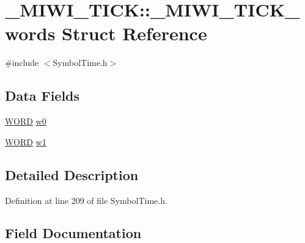 \hypertarget{struct___m_i_w_i___t_i_c_k_1_1___m_i_w_i___t_i_c_k__words}{}\section{\+\_\+\+M\+I\+W\+I\+\_\+\+T\+I\+C\+K\+:\+:\+\_\+\+M\+I\+W\+I\+\_\+\+T\+I\+C\+K\+\_\+words Struct Reference}
\label{struct___m_i_w_i___t_i_c_k_1_1___m_i_w_i___t_i_c_k__words}


{\ttfamily \#include $<$Symbol\+Time.\+h$>$}

\subsection*{Data Fields}
\begin{DoxyCompactItemize}
\item 
\hyperlink{_generic_type_defs_8h_a2b0e863dadf920709ec53d9088ee7c91}{W\+O\+R\+D} \hyperlink{struct___m_i_w_i___t_i_c_k_1_1___m_i_w_i___t_i_c_k__words_ad79610e3e03eb4ab5da26206121b2446}{w0}
\item 
\hyperlink{_generic_type_defs_8h_a2b0e863dadf920709ec53d9088ee7c91}{W\+O\+R\+D} \hyperlink{struct___m_i_w_i___t_i_c_k_1_1___m_i_w_i___t_i_c_k__words_ac2736ca355e33e00e2fc64077cbceab9}{w1}
\end{DoxyCompactItemize}


\subsection{Detailed Description}


Definition at line 209 of file Symbol\+Time.\+h.



\subsection{Field Documentation}
\hypertarget{struct___m_i_w_i___t_i_c_k_1_1___m_i_w_i___t_i_c_k__words_ad79610e3e03eb4ab5da26206121b2446}{}
